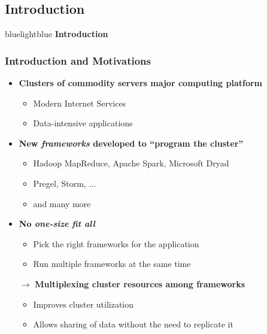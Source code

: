\subsection{Introduction}
\begin{frame}
 \begin{colorblock}{blue}{lightblue}{ }
    \Large \textbf{Introduction}
  \end{colorblock}
\end{frame}

\begin{frame}
\frametitle{Introduction and Motivations}
\begin{itemize}
	\item {\bf Clusters of commodity servers major computing platform}
	\begin{itemize}
		\item Modern Internet Services
		\item Data-intensive applications
	\end{itemize}
	\item {\bf New {\it frameworks} developed to ``program the cluster''}
	\begin{itemize}
		\item Hadoop MapReduce, Apache Spark, Microsoft Dryad
		\item Pregel, Storm, ...
		\item and many more
	\end{itemize}
	\item {\bf No {\it one-size fit all}}
	\begin{itemize}
		\item Pick the right frameworks for the application
		\item Run multiple frameworks at the same time
	\end{itemize}
	\item[$\to$] {\bf Multiplexing cluster resources among frameworks}
	\begin{itemize}
		\item Improves cluster utilization
		\item Allows sharing of data without the need to replicate it
	\end{itemize}
\end{itemize}
\end{frame}

